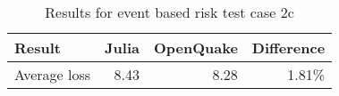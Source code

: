 \begin{table}[htbp]

\centering
\begin{tabular}{ l r r r }

\hline
\rowcolor{anti-flashwhite}
\bf{Result} & \bf{Julia} & \bf{OpenQuake} & \bf{Difference}\\
\hline
Average loss & 8.43 & 8.28 & 1.81\% \\
\hline
\end{tabular}

\caption{Results for event based risk test case 2c}
\label{tab:result-ebr-2c}
\end{table}